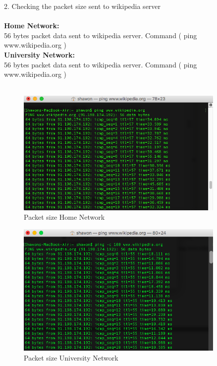 \documentclass{WeSTassignment}
\begin{document}
\textrm{2. Checking the packet size sent to wikipedia server}\\ \\
\textbf{Home Network:\\}
56 bytes packet data sent to wikipedia server. Command ( ping www.wikipedia.org )\\
\textbf{University Network:\\}
56 bytes packet data sent to wikipedia server. Command ( ping www.wikipedia.org )\\ \\
\begin{figure}[bp!]
  \centering
  \includegraphics[width=0.9\textwidth]{home_ping1.png}
   \caption{Packet size Home Network}
     \label{fig:packetsize}
\end{figure}
\begin{figure}[bp!]
  \centering
  \includegraphics[width=0.9\textwidth]{uni_ping1.png} 
   \caption{Packet size University Network}
     \label{fig:packetsize}
\end{figure}
\end{document}
